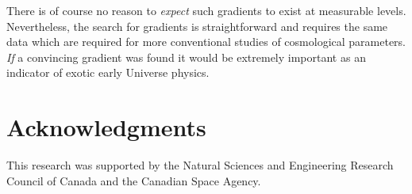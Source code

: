 \documentclass[twocolumn,aps,prd,showpacs]{revtex4}
\begin{document}
There is of course no reason to {\it expect\/} such gradients to exist at
measurable levels.  Nevertheless, the search for gradients is straightforward
and requires the same data which are required for more conventional
studies of cosmological parameters.  {\it If\/} a convincing gradient was
found it would be extremely important as an indicator of exotic early Universe
physics.




\section*{Acknowledgments} 
This research was supported by the Natural Sciences and Engineering 
Research Council of Canada and the Canadian Space Agency.



\end{document}
